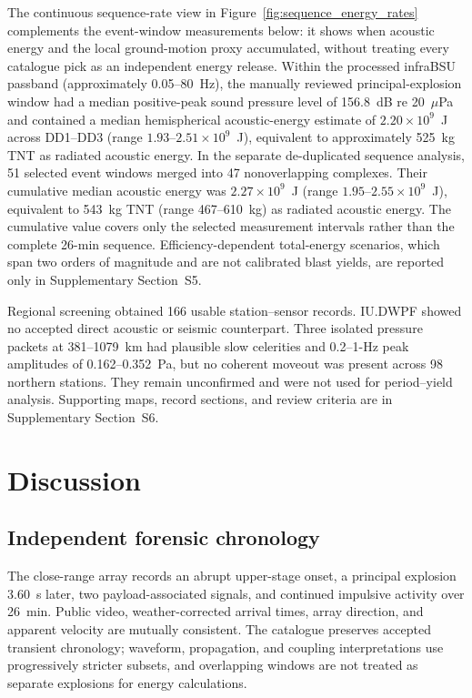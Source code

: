 \documentclass[]{seismica}
\begin{document}
The continuous sequence-rate view in
Figure~\ref{fig:sequence_energy_rates} complements the event-window
measurements below: it shows when acoustic energy and the local ground-motion
proxy accumulated, without treating every catalogue pick as an independent
energy release. Within the processed infraBSU passband (approximately
0.05--80~Hz), the manually reviewed principal-explosion window had a median positive-peak sound
pressure level of 156.8~dB re 20~$\mu$Pa and contained a median
hemispherical acoustic-energy estimate of $2.20\times10^9$~J across DD1--DD3
(range $1.93$--$2.51\times10^9$~J), equivalent to approximately 525~kg TNT as
radiated acoustic energy. In the separate de-duplicated sequence analysis,
51 selected event windows merged into 47 nonoverlapping complexes. Their
cumulative median acoustic energy was $2.27\times10^9$~J
(range $1.95$--$2.55\times10^9$~J), equivalent to 543~kg TNT
(range 467--610~kg) as radiated acoustic energy. The cumulative value covers
only the selected measurement intervals rather than the complete 26-min
sequence. Efficiency-dependent total-energy scenarios, which span two orders
of magnitude and are not calibrated blast yields, are reported only in
Supplementary Section~S5.

Regional screening obtained 166 usable station--sensor records. IU.DWPF showed
no accepted direct acoustic or seismic counterpart. Three isolated pressure
packets at 381--1079~km had plausible slow celerities and 0.2--1-Hz peak
amplitudes of 0.162--0.352~Pa, but no coherent moveout was present across 98
northern stations. They remain unconfirmed and were not used for period--yield
analysis. Supporting maps, record sections, and review criteria are in
Supplementary Section~S6.

\FloatBarrier

\section{Discussion}
\label{sec:discussion}

\subsection{Independent forensic chronology}

The close-range array records an abrupt upper-stage onset, a principal
explosion 3.60~s later, two payload-associated signals, and continued
impulsive activity over 26~min. Public video, weather-corrected arrival times,
array direction, and apparent velocity are mutually consistent. The catalogue
preserves accepted transient chronology; waveform, propagation, and coupling
interpretations use progressively stricter subsets, and overlapping windows
are not treated as separate explosions for energy calculations.
\end{document}
